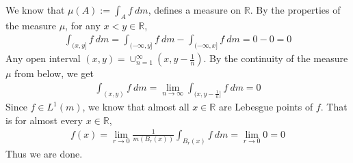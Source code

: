 \documentclass[12pt]{exam}
\theoremstyle{plain} %
\theoremstyle{definition} %
\theoremstyle{remark} %
\begin{document}
\begin{questions}
  \question
  \begin{solution}
    We know that $\mu(A):= \int_A  f \ d m$, defines a measure on
    $\mathbb{R}$. By the properties of the measure $\mu$, for any $x< y
    \in \mathbb{R}$,
    \begin{align*}
      \int_{(x, y]} f \ dm = \int_{(-\infty, y]} f \ dm -
      \int_{(-\infty,x]} f \ dm = 0 - 0 = 0
    \end{align*}
    Any open interval $(x, y) = \cup_{n = 1}^{\infty}(x,
    y- \frac{1}{n})$. By the continuity of the measure $\mu$ from
    below, we get
    \begin{align*}
      \int_{(x, y)}  f \ d m = \lim_{n \to \infty}   \int_{(x, y-
      \frac{1}{n}]}  f \ d m = 0
    \end{align*}
    Since $f \in L^{1}(m)$, we know that almost all $x \in
    \mathbb{R}$ are Lebesgue points of $f$. That is for almost every
    $x \in \mathbb{R}$,
    \begin{align*}
      f(x) = \lim_{r \to 0} \frac{1}{m(B_r(x))} \int_{B_r(x)} f \ d m
      = \lim_{r \to 0} 0 = 0
    \end{align*}
    Thus we are done.
  \end{solution}

\end{questions}
\printbibliography[heading=bibintoc]
\end{document}
